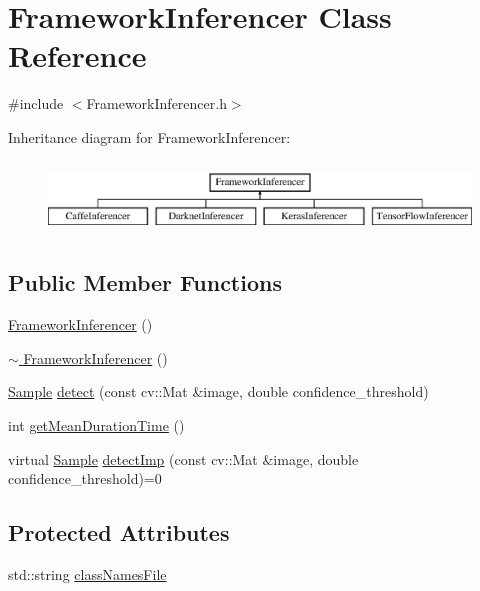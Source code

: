 \hypertarget{class_framework_inferencer}{}\section{Framework\+Inferencer Class Reference}
\label{class_framework_inferencer}


{\ttfamily \#include $<$Framework\+Inferencer.\+h$>$}

Inheritance diagram for Framework\+Inferencer\+:\begin{figure}[H]
\begin{center}
\leavevmode
\includegraphics[height=1.931034cm]{class_framework_inferencer}
\end{center}
\end{figure}
\subsection*{Public Member Functions}
\begin{DoxyCompactItemize}
\item 
\hyperlink{class_framework_inferencer_adda91b1e8b6238e4cd3cc18e84675fea}{Framework\+Inferencer} ()
\item 
\hyperlink{class_framework_inferencer_a0a0ad89131a1f2a2377a3003b0c1d319}{$\sim$ Framework\+Inferencer} ()
\item 
\hyperlink{struct_sample}{Sample} \hyperlink{class_framework_inferencer_a4c2b3b0ec03df5f97e7b32235422dc60}{detect} (const cv\+::\+Mat \&image, double confidence\+\_\+threshold)
\item 
int \hyperlink{class_framework_inferencer_a51291e562ddc5a4b86c0c413439d59a5}{get\+Mean\+Duration\+Time} ()
\item 
virtual \hyperlink{struct_sample}{Sample} \hyperlink{class_framework_inferencer_a8fd7e708c8be4471bc2b37a4193a9045}{detect\+Imp} (const cv\+::\+Mat \&image, double confidence\+\_\+threshold)=0
\end{DoxyCompactItemize}
\subsection*{Protected Attributes}
\begin{DoxyCompactItemize}
\item 
std\+::string \hyperlink{class_framework_inferencer_abdb304d43262f48e0438a55778c7540f}{class\+Names\+File}
\end{DoxyCompactItemize}


